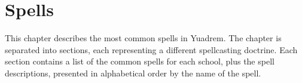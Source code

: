 \chapter{Spells}
This chapter describes the most common spells in Yuadrem.
The chapter is separated into sections, each representing a different spellcasting doctrine.
Each section contains a list of the common spells for each school, plus the spell descriptions, presented in alphabetical order by the name of the spell.




% 
% 
% 
% 
% 
% 
% 




